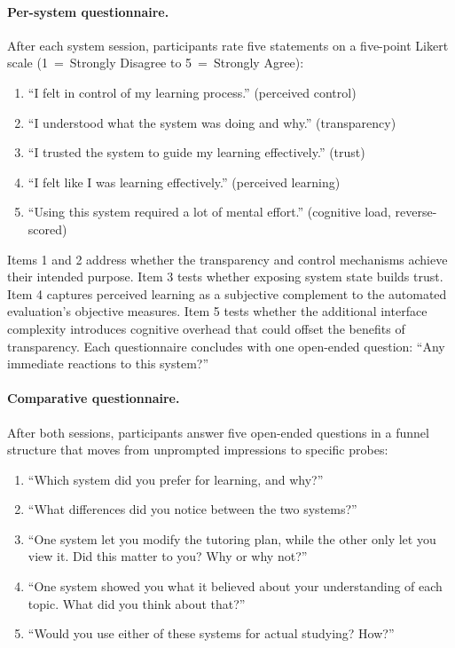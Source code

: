 \documentclass[logo,bsc,singlespacing,parskip,online]{infthesis}
\begin{document}
\paragraph{Per-system questionnaire.} After each system session, participants rate five statements on a five-point Likert scale (1~=~Strongly Disagree to 5~=~Strongly Agree):

\begin{enumerate}
    \item ``I felt in control of my learning process.'' (perceived control)
    \item ``I understood what the system was doing and why.'' (transparency)
    \item ``I trusted the system to guide my learning effectively.'' (trust)
    \item ``I felt like I was learning effectively.'' (perceived learning)
    \item ``Using this system required a lot of mental effort.'' (cognitive load, reverse-scored)
\end{enumerate}

Items 1 and 2 address whether the transparency and control mechanisms achieve their intended purpose. Item 3 tests whether exposing system state builds trust. Item 4 captures perceived learning as a subjective complement to the automated evaluation's objective measures. Item 5 tests whether the additional interface complexity introduces cognitive overhead that could offset the benefits of transparency. Each questionnaire concludes with one open-ended question: ``Any immediate reactions to this system?''

\paragraph{Comparative questionnaire.} After both sessions, participants answer five open-ended questions in a funnel structure that moves from unprompted impressions to specific probes:

\begin{enumerate}
    \item ``Which system did you prefer for learning, and why?''
    \item ``What differences did you notice between the two systems?''
    \item ``One system let you modify the tutoring plan, while the other only let you view it. Did this matter to you? Why or why not?''
    \item ``One system showed you what it believed about your understanding of each topic. What did you think about that?''
    \item ``Would you use either of these systems for actual studying? How?''
\end{enumerate}
\end{document}
